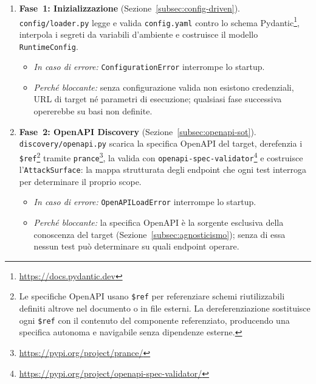 \begin{enumerate}
      \item \textbf{Fase~1: Inizializzazione} (Sezione~\ref{subsec:config-driven}). \texttt{config/loader.py} legge e
            valida \texttt{config.yaml} contro lo schema Pydantic\footnote{\url{https://docs.pydantic.dev}}, interpola i segreti
            da variabili d'ambiente e costruisce il modello \texttt{RuntimeConfig}.
            \begin{itemize}
                  \item \textit{In caso di errore:} \texttt{ConfigurationError} interrompe
                        lo startup.
                  \item \textit{Perché bloccante:} senza configurazione valida non esistono
                        credenziali, \gls{URL} di target né parametri di esecuzione; qualsiasi
                        fase successiva opererebbe su basi non definite.
            \end{itemize}

      \item \textbf{Fase~2: OpenAPI Discovery} (Sezione~\ref{subsec:openapi-sot}). \texttt{discovery/openapi.py}
            scarica la specifica OpenAPI del target, derefenzia i \texttt{\$ref}\footnote{Le specifiche OpenAPI usano \texttt{\$ref} per referenziare schemi riutilizzabili definiti altrove nel documento o in file esterni. La dereferenziazione sostituisce ogni \texttt{\$ref} con il contenuto del componente referenziato, producendo una specifica autonoma e navigabile senza dipendenze esterne.} tramite
            \texttt{prance}\footnote{\url{https://pypi.org/project/prance/}}, la valida con \texttt{openapi-spec-validator}\footnote{\url{https://pypi.org/project/openapi-spec-validator/}} e costruisce
            l'\texttt{AttackSurface}: la mappa strutturata degli endpoint che ogni test
            interroga per determinare il proprio scope.
            \begin{itemize}
                  \item \textit{In caso di errore:} \texttt{OpenAPILoadError} interrompe
                        lo startup.
                  \item \textit{Perché bloccante:} la specifica OpenAPI è la sorgente esclusiva della conoscenza del target (Sezione~\ref{subsec:agnosticismo}); senza di essa nessun test può determinare su quali endpoint operare.
            \end{itemize}


\end{enumerate}
